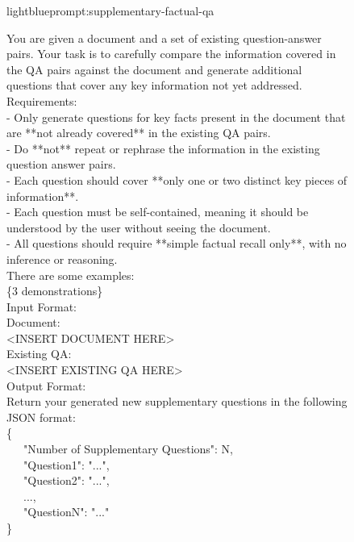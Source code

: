 \documentclass{applemlr}
\numberwithin{equation}{section}
\begin{document}

\begin{figure}[t]
\centering
\begin{minipage}{0.95\textwidth}
\begin{promptbox}[\color{black}{Prompt for Supplementary Simple QA Generation}]{lightblue}{prompt:supplementary-factual-qa}
\label{temp:supplementary_factual_qa_generation_prompt}

\ttfamily
You are given a document and a set of existing question-answer pairs. Your task is to carefully compare the information covered in the QA pairs against the document and generate additional questions that cover any key information not yet addressed. \\[4pt]

Requirements: \\
- Only generate questions for key facts present in the document that are **not already covered** in the existing QA pairs. \\
- Do **not** repeat or rephrase the information in the existing question answer pairs. \\
- Each question should cover **only one or two distinct key pieces of information**. \\
- Each question must be self-contained, meaning it should be understood by the user without seeing the document. \\
- All questions should require **simple factual recall only**, with no inference or reasoning. \\[6pt]

There are some examples: \\
\{3 demonstrations\} \\[6pt]

Input Format: \\
Document: \\
<INSERT DOCUMENT HERE> \\
Existing QA: \\
<INSERT EXISTING QA HERE> \\[6pt]

Output Format: \\
Return your generated new supplementary questions in the following JSON format: \\
\{ \\
\ \ \ "Number of Supplementary Questions": N, \\
\ \ \ "Question1": "...", \\
\ \ \ "Question2": "...", \\
\ \ \ ..., \\
\ \ \ "QuestionN": "..." \\
\} \\[6pt]


\end{promptbox}
\end{minipage}
\end{figure}
\end{document}
